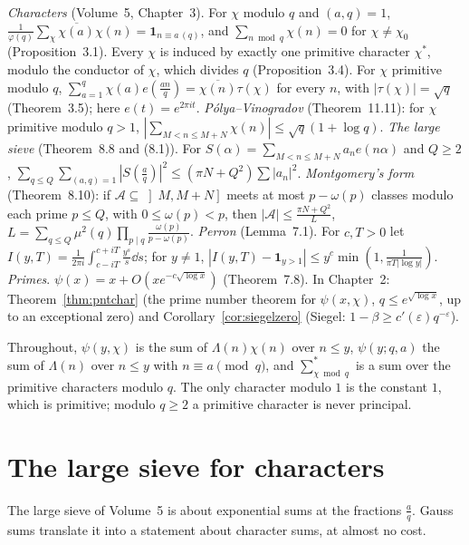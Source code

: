 \begin{reminder}
\emph{Characters} (Volume~5, Chapter~3). For $\chi$ modulo $q$ and $(a,q)=1$, $\frac1{\varphi(q)}\sum_\chi\overline{\chi(a)}\chi(n)=\mathbf 1_{n\equiv a\,(q)}$, and $\sum_{n\bmod q}\chi(n)=0$ for $\chi\ne\chi_0$ (Proposition~3.1). Every $\chi$ is induced by exactly one primitive character $\chi^*$, modulo the conductor of $\chi$, which divides $q$ (Proposition~3.4). For $\chi$ primitive modulo $q$, $\sum_{a=1}^q\chi(a)e(\frac{an}q)=\overline{\chi(n)}\tau(\chi)$ for every $n$, with $|\tau(\chi)|=\sqrt q$ (Theorem~3.5); here $e(t)=e^{2\pi it}$. \emph{Pólya--Vinogradov} (Theorem~11.11): for $\chi$ primitive modulo $q>1$, $|\sum_{M<n\le M+N}\chi(n)|\le\sqrt q(1+\log q)$.
\emph{The large sieve} (Theorem~8.8 and (8.1)). For $S(\alpha)=\sum_{M<n\le M+N}a_ne(n\alpha)$ and $Q\ge2$,
$\sum_{q\le Q}\sum_{(a,q)=1}|S(\frac aq)|^2\le(\pi N+Q^2)\sum|a_n|^2$. \emph{Montgomery's form} (Theorem~8.10): if $\mathcal A\subseteq\left]M,M+N\right]$ meets at most $p-\omega(p)$ classes modulo each prime $p\le Q$, with $0\le\omega(p)<p$, then $|\mathcal A|\le\frac{\pi N+Q^2}L$, $L=\sum_{q\le Q}\mu^2(q)\prod_{p\mid q}\frac{\omega(p)}{p-\omega(p)}$.
\emph{Perron} (Lemma~7.1). For $c,T>0$ let $I(y,T)=\frac1{2\pi i}\int_{c-iT}^{c+iT}\frac{y^s}s\dd s$; for $y\ne1$, $|I(y,T)-\mathbf 1_{y>1}|\le y^c\min(1,\frac1{\pi T|\log y|})$.
\emph{Primes}. $\psi(x)=x+O(xe^{-c\sqrt{\log x}})$ (Theorem~7.8). In Chapter~2: Theorem~\ref{thm:pntchar} (the prime number theorem for $\psi(x,\chi)$, $q\le e^{\sqrt{\log x}}$, up to an exceptional zero) and Corollary~\ref{cor:siegelzero} (Siegel: $1-\beta\ge c'(\varepsilon)q^{-\varepsilon}$).
\end{reminder}

Throughout, $\psi(y,\chi)$ is the sum of $\Lambda(n)\chi(n)$ over $n\le y$, $\psi(y;q,a)$ the sum of $\Lambda(n)$ over $n\le y$ with $n\equiv a\pmod q$, and $\sum^*_{\chi\bmod q}$ is a sum over the primitive characters modulo $q$. The only character modulo $1$ is the constant $1$, which is primitive; modulo $q\ge2$ a primitive character is never principal.

\section{The large sieve for characters}

The large sieve of Volume~5 is about exponential sums at the fractions $\frac aq$. Gauss sums translate it into a statement about character sums, at almost no cost.

